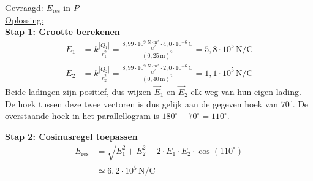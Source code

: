 \documentclass{ximera}
\begin{document}
\begin{exercise}
\begin{solution}
        \underline{Gevraagd:} $E_{\text{res}}$ in $P$\\

        \underline{Oplossing:}\\
        \textbf{Stap 1: Grootte berekenen}
        \begin{align*}
            E_{1} &= k \frac{|Q_{1}|}{r_{1}^{2}} = \frac{8{,}99 \cdot 10^{9} \, \mathrm{\frac{N \cdot m^2}{C^2}} \cdot 4{,}0 \cdot 10^{-6} \, \mathrm{C}}{(0{,}25 \, \mathrm{m})^{2}} = 5{,}8 \cdot 10^{5} \, \mathrm{N/C} \\
            E_{2} &= k \frac{|Q_{2}|}{r_{2}^{2}} = \frac{8{,}99 \cdot 10^{9} \, \mathrm{\frac{N \cdot m^2}{C^2}} \cdot 2{,}0 \cdot 10^{-6} \, \mathrm{C}}{(0{,}40 \, \mathrm{m})^{2}} = 1{,}1 \cdot 10^{5} \, \mathrm{N/C}
        \end{align*}
        Beide ladingen zijn positief, dus wijzen $\vec{E}_1$ en $\vec{E}_2$ elk weg van hun eigen lading. De hoek tussen deze twee vectoren is dus gelijk aan de gegeven hoek van $70^\circ$. De overstaande hoek in het parallellogram is $180^\circ - 70^\circ = 110^\circ$.

        \textbf{Stap 2: Cosinusregel toepassen}
        \begin{align*}
            E_{\text{res}} &= \sqrt{E_1^{2} + E_2^{2} - 2 \cdot E_1 \cdot E_2 \cdot \cos(110^\circ)} \\
                            &\simeq \boxed{6{,}2 \cdot 10^{5} \, \mathrm{N/C}}
        \end{align*}
    \end{solution}
\end{exercise}
\end{document}
